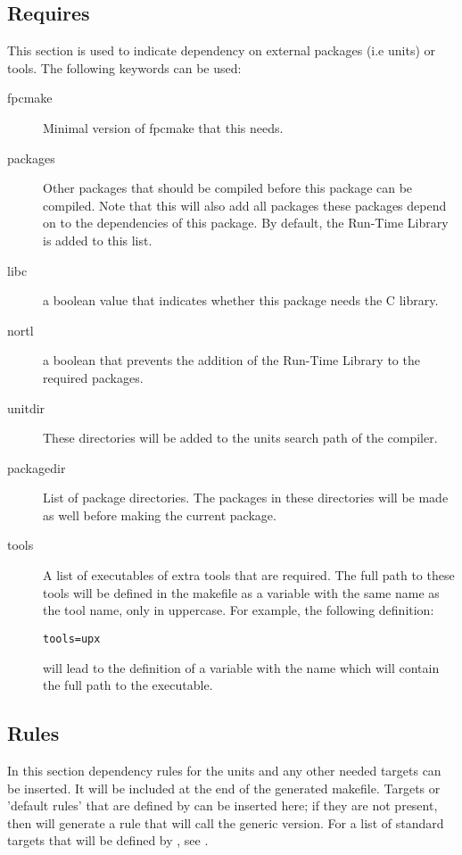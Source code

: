 {\subsection{Requires}
This section is used to indicate dependency on external packages (i.e units)
or tools. The following keywords can be used:
\begin{description}
\item[fpcmake] Minimal version of fpcmake that this  needs.
\item[packages] Other packages that should be compiled before this package
can be compiled. Note that this will also add all packages these packages
depend on to the dependencies of this package. By default, the \fpc Run-Time
Library is added to this list.
\item[libc] a boolean value that indicates whether this package needs the C
library.
\item[nortl] a boolean that prevents the addition of the \fpc Run-Time 
Library to the required packages.
\item[unitdir] These directories will be added to the units search path of
the compiler.
\item[packagedir] List of package directories. The packages in these
directories will be made as well before making the current package.
\item[tools] A list of executables of extra tools that are required. The
full path to these tools will be defined in the makefile as a variable with
the same name as the tool name, only in uppercase. For example, the
following definition:
\begin{verbatim}
tools=upx
\end{verbatim}
will lead to the definition of a variable with the name  which will
contain the full path to the  executable.
\end{description}

\subsection{Rules}
In this section dependency rules for the units and any other needed 
targets can be inserted. It will be included at the end of the generated
makefile. Targets or 'default rules' that are defined by \fpcmake{} 
can be inserted here; if they are not present, then \fpcmake{} will generate
a rule that will call the generic  version. For a list of standard 
targets that will be defined by \fpcmake{}, see .

}
